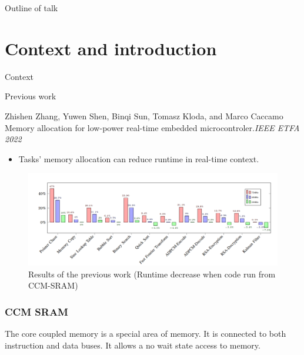 \documentclass[
	11pt, %
]{beamer}
\begin{document}
\begin{frame}{Outline of talk}
	\tableofcontents
\end{frame}

\section{Context and introduction}

\begin{frame}{Context}
	\begin{block}{Previous work}

		\begin{thebibliography}{10}
			{\tiny
			\bibitem{} Zhishen Zhang, Yuwen Shen, Binqi Sun, Tomasz Kloda, and Marco Caccamo
			\newblock Memory allocation for low-power real-time embedded microcontroler.{\em{IEEE ETFA 2022}}
			}
		\end{thebibliography}
		\begin{itemize}
			\item Tasks' memory allocation can reduce runtime in real-time context.
		\end{itemize}
	\end{block}
	\begin{figure}
		\centering
		\includegraphics[scale=0.5]{images/boost.png}
		\caption{Results of the previous work (Runtime decrease when code run from CCM-SRAM)}
	\end{figure}
\end{frame}





\begin{frame}
    \frametitle{CCM SRAM}
	\begin{center}
		
	\end{center}
    The core coupled memory is a special area of memory. 
    It is connected to both instruction and data buses.
    It allows a no wait state access to memory. 
\end{frame}
\end{document}
